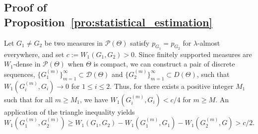 \documentclass[11pt,twoside]{article} %
\begin{document}


\subsection{Proof of Proposition~\ref{pro:statistical_estimation}}
\label{app:proof:prop_estimation}
Let $G_1\ne G_2$ be two measures in $\mathcal P(\Theta)$ satisfy $p_{G_1}=p_{G_2}$ for $\lambda$-almost everywhere, and set
$c:=W_1(G_1,G_2)>0$. Since finitely supported measures are $W_1$-dense in $\mathcal P(\Theta)$ when
$\Theta$ is compact, we can construct a pair of discrete sequences, $\{G_1^{(m)}\}_{m=1}^\infty \subset \mathcal{D}(\Theta)$ and $\{G_2^{(m)}\}_{m=1}^\infty \subset D(\Theta)$, such that 
$W_1(G_i^{(m)},G_i)\to 0$ for $1 \leq i \leq 2$. Thus, for there exists a positive integer $M_1$ such that for all $m\geq M_1$, we have $W_1(G_i^{(m)},G_i)< c/4$ for $m \geq M$.
An application of the triangle inequality yields
\begin{equation*}
    W_1(G_1^{(m)},G_2^{(m)})\geq W_1(G_1,G_2) -  W_1(G_1^{(m)},G_1) -W_1(G_2^{(m)},G) > c/2.
\end{equation*}
\end{document}
